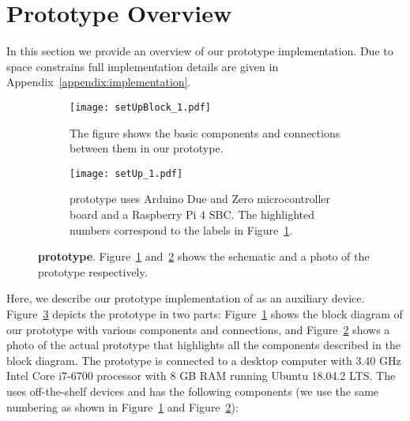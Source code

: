 \section{\name Prototype Overview}
\label{sec:prototype}

In this section we provide an overview of our \name prototype implementation. Due to space constrains full implementation details are given in Appendix~\ref{appendix:implementation}.

\begin{figure}[t]
    \begin{center}
        \begin{subfigure}{0.4\textwidth}
        \centering
            \texttt{[image: setUpBlock\_1.pdf]}
            \caption{The figure shows the basic components and connections between them in our \name prototype.}
            \label{fig:prototypeArch}    
        \end{subfigure}
    \end{center}
    
    
    \begin{center}
        \begin{subfigure}{0.4\textwidth}
        \centering
        \texttt{[image: setUp\_1.pdf]}
        \caption{\name prototype uses Arduino Due and Zero microcontroller board and a Raspberry Pi 4 SBC. The highlighted numbers correspond to the labels in Figure~\ref{fig:prototypeArch}.}
        \label{fig:prototype}
    \end{subfigure}
    \end{center}
    \vspace{-1em}
    
    \caption{\textbf{\name prototype}. Figure~\ref{fig:prototypeArch} and~\ref{fig:prototype} shows the schematic and a photo of the  \name prototype respectively.} 
    \label{fig:prototypeAll}
    \spacesave
\end{figure}

 Here, we describe our prototype implementation of \name as an auxiliary device. Figure~\ref{fig:prototypeAll} depicts the \name prototype in two parts: Figure~\ref{fig:prototypeArch} shows the block diagram of our prototype with various components and connections, and Figure~\ref{fig:prototype} shows a photo of the actual prototype that highlights all the components described in the block diagram. The prototype \device is connected to a desktop computer with 3.40 GHz Intel Core i7-6700 processor with 8 GB RAM running Ubuntu 18.04.2 LTS. The \device uses off-the-shelf devices and has the following components (we use the same numbering as shown in Figure~\ref{fig:prototypeArch} and  Figure~\ref{fig:prototype}):

